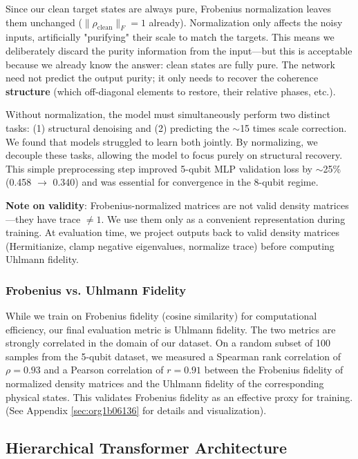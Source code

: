 \documentclass[11pt]{article}
\begin{document}
Since our clean target states are always pure, Frobenius normalization leaves them unchanged (\(\|\rho_{\text{clean}}\|_F = 1\) already). Normalization only affects the noisy inputs, artificially "purifying" their scale to match the targets. This means we deliberately discard the purity information from the input---but this is acceptable because we already know the answer: clean states are fully pure. The network need not predict the output purity; it only needs to recover the coherence \textbf{structure} (which off-diagonal elements to restore, their relative phases, etc.).

Without normalization, the model must simultaneously perform two distinct tasks: (1) structural denoising and (2) predicting the \(\sim\)15 times scale correction. We found that models struggled to learn both jointly. By normalizing, we decouple these tasks, allowing the model to focus purely on structural recovery. This simple preprocessing step improved 5-qubit MLP validation loss by \(\sim\)25\% (0.458 \(\to\) 0.340) and was essential for convergence in the 8-qubit regime.

\textbf{Note on validity}: Frobenius-normalized matrices are not valid density matrices---they have trace \(\neq 1\). We use them only as a convenient representation during training. At evaluation time, we project outputs back to valid density matrices (Hermitianize, clamp negative eigenvalues, normalize trace) before computing Uhlmann fidelity.
\subsubsection{Frobenius vs. Uhlmann Fidelity}
\label{sec:orgda2badf}

While we train on Frobenius fidelity (cosine similarity) for computational efficiency, our final evaluation metric is Uhlmann fidelity. The two metrics are strongly correlated in the domain of our dataset. On a random subset of 100 samples from the 5-qubit dataset, we measured a Spearman rank correlation of \(\rho = 0.93\) and a Pearson correlation of \(r = 0.91\) between the Frobenius fidelity of normalized density matrices and the Uhlmann fidelity of the corresponding physical states. This validates Frobenius fidelity as an effective proxy for training. (See Appendix \ref{sec:org1b06136} for details and visualization).
\subsection{Hierarchical Transformer Architecture}
\label{sec:org19f44ed}
\end{document}
